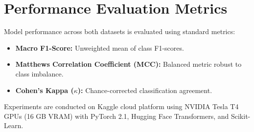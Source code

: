 \section{Performance Evaluation Metrics}

Model performance across both datasets is evaluated using standard metrics:
\begin{itemize}[leftmargin=*]
    \item \textbf{Macro F1-Score:} Unweighted mean of class F1-scores.
    \item \textbf{Matthews Correlation Coefficient (MCC):} Balanced metric robust to class imbalance.
    \item \textbf{Cohen's Kappa ($\kappa$):} Chance-corrected classification agreement.
\end{itemize}

Experiments are conducted on Kaggle cloud platform using NVIDIA Tesla T4 GPUs (16 GB VRAM) with PyTorch 2.1, Hugging Face Transformers, and Scikit-Learn.
